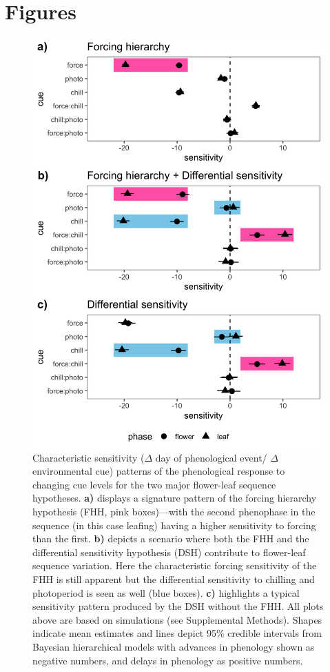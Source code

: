 \documentclass[11pt]{article}\usepackage[]{graphicx}\usepackage[]{color}
\begin{document}
\section*{Figures}
\begin{figure}[h!]
    \centering
         \includegraphics[width=.7\textwidth]{..//Plots/Flobuds_manuscript_figs/simulations.png}
    \caption{Characteristic sensitivity ($\Delta$ day of phenological event/ $\Delta$ environmental cue) patterns of the phenological response to changing cue levels for the two major flower-leaf sequence hypotheses.  \textbf{a)} displays a signature pattern of the forcing hierarchy hypothesis (FHH, pink boxes)---with the second phenophase in the sequence (in this case leafing) having a higher sensitivity to forcing than the first. \textbf{b)} depicts a scenario where both the FHH and the differential sensitivity hypothesis (DSH) contribute to flower-leaf sequence variation. Here the characteristic forcing sensitivity of the FHH is still apparent but the differential sensitivity to chilling and photoperiod is seen as well (blue boxes). \textbf{c)} highlights a typical sensitivity pattern produced by the DSH without the FHH. All plots above are based on simulations (see Supplemental Methods). Shapes indicate mean estimates and lines depict 95\% credible intervals from Bayesian hierarchical models with advances in phenology shown as negative numbers, and delays in phenology as positive numbers. } 
    \label{fig:simulations}
\end{figure}
\pagebreak
\end{document}
